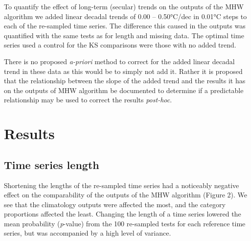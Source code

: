 \documentclass[]{article}
\begin{document}
To quantify the effect of long-term (secular) trends on the outputs of
the MHW algorithm we added linear decadal trends of 0.00 -- 0.50°C/dec
in 0.01°C steps to each of the re-sampled time series. The difference
this caused in the outputs was quantified with the same tests as for
length and missing data. The optimal time series used a control for the
KS comparisons were those with no added trend.

There is no proposed \emph{a-priori} method to correct for the added
linear decadal trend in these data as this would be to simply not add
it. Rather it is proposed that the relationship between the slope of the
added trend and the results it has on the outputs of MHW algorithm be
documented to determine if a predictable relationship may be used to
correct the results \emph{post-hoc}.

\hypertarget{results}{%
\section{Results}\label{results}}

\hypertarget{time-series-length}{%
\subsection{Time series length}\label{time-series-length}}

Shortening the lengths of the re-sampled time series had a noticeably
negative effect on the comparability of the outputs of the MHW algorithm
(Figure 2). We see that the climatology outputs were affected the most,
and the category proportions affected the least. Changing the length of
a time series lowered the mean probability (\emph{p}-value) from the 100
re-sampled tests for each reference time series, but was accompanied by
a high level of variance.
\end{document}
